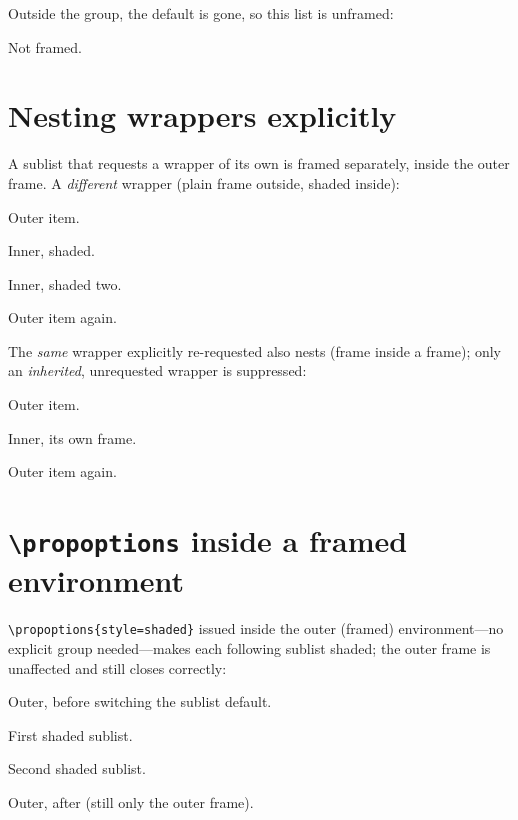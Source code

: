 \documentclass{article}
\begin{document}
Outside the group, the default is gone, so this list is unframed:

\begin{prop}
  \item Not framed.
\end{prop}

\section{Nesting wrappers explicitly}

A sublist that requests a wrapper of its own is framed separately, inside the
outer frame.  A \emph{different} wrapper (plain frame outside, shaded inside):

\begin{prop}[style=framed]
  \item Outer item. \label{w:no}
  \begin{prop}[style=shaded]
    \item Inner, shaded.
    \item Inner, shaded two.
  \end{prop}
  \item Outer item again.
\end{prop}

The \emph{same} wrapper explicitly re-requested also nests (frame inside a
frame); only an \emph{inherited}, unrequested wrapper is suppressed:

\begin{prop}[style=framed]
  \item Outer item.
  \begin{prop}[style=framed]
    \item Inner, its own frame.
  \end{prop}
  \item Outer item again.
\end{prop}

\section{\texttt{\textbackslash propoptions} inside a framed environment}

\texttt{\textbackslash propoptions\{style=shaded\}} issued inside the outer
(framed) environment---no explicit group needed---makes each following sublist
shaded; the outer frame is unaffected and still closes correctly:

\begin{prop}[style=framed]
  \item Outer, before switching the sublist default.
  \begin{prop}
    \item First shaded sublist.
  \end{prop}
  \begin{prop}
    \item Second shaded sublist.
  \end{prop}
  \item Outer, after (still only the outer frame).
\end{prop}
\end{document}
